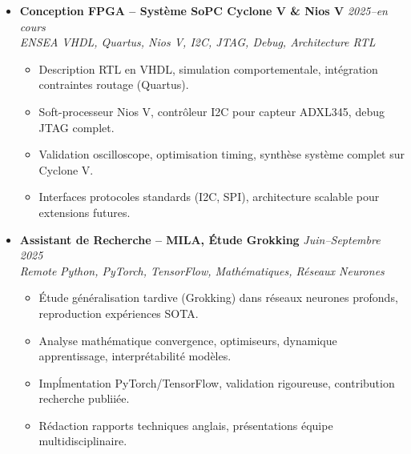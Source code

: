 \documentclass[a4paper,11pt]{article}
\begin{document}
\begin{itemize}[leftmargin=*, label={-}]
    \vspace{3pt}
    \item \textbf{Conception FPGA -- Syst\`eme SoPC Cyclone V \& Nios V} \hfill \textit{2025--en cours} \\
    \textit{ENSEA} \hfill \textit{VHDL, Quartus, Nios V, I2C, JTAG, Debug, Architecture RTL}
    \vspace{-2pt}
        \begin{itemize}[leftmargin=0.4cm, nosep, label=\tiny$\bullet$]
            \item \small{Description RTL en VHDL, simulation comportementale, intégration contraintes routage (Quartus).}
            \item \small{Soft-processeur Nios V, contr\^oleur I2C pour capteur ADXL345, debug JTAG complet.}
            \item \small{Validation oscilloscope, optimisation timing, synth\`ese syst\`eme complet sur Cyclone V.}
            \item \small{Interfaces protocoles standards (I2C, SPI), architecture scalable pour extensions futures.}
        \end{itemize}
    \vspace{3pt}
    \item \textbf{Assistant de Recherche -- MILA, \'Etude Grokking} \hfill \textit{Juin--Septembre 2025} \\
    \textit{Remote} \hfill \textit{Python, PyTorch, TensorFlow, Math\'ematiques, R\'eseaux Neurones}
    \vspace{-2pt}
        \begin{itemize}[leftmargin=0.4cm, nosep, label=\tiny$\bullet$]
            \item \small{\'Etude g\'en\'eralisation tardive (Grokking) dans r\'eseaux neurones profonds, reproduction expériences SOTA.}
            \item \small{Analyse math\'ematique convergence, optimiseurs, dynamique apprentissage, interpr\'etabilit\'e mod\`eles.}
            \item \small{Imp\'lmentation PyTorch/TensorFlow, validation rigoureuse, contribution recherche publii\'ee.}
            \item \small{R\'edaction rapports techniques anglais, pr\'esentations \'equipe multidisciplinaire.}
        \end{itemize}
\end{itemize}
\end{document}
